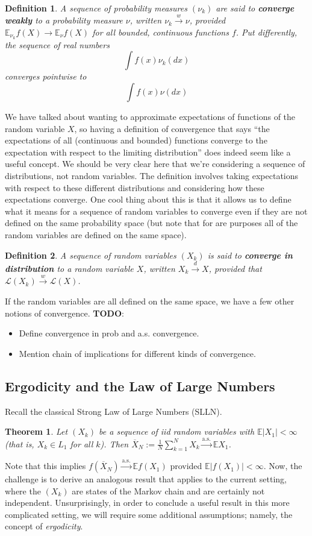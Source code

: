 \documentclass[12pt]{article}
\newcommand*{\abs}[1]{\left\lvert#1\right\rvert}
\newcommand{\E}{\mathbb{E}}
\newtheorem{definition}{Definition}
\newtheorem{thm}{Theorem}
\begin{document}
\begin{definition}
A sequence of probability measures $(\nu_k)$ are said to \textbf{converge weakly} to a probability measure $\nu$, written $\nu_k \overset{w}{\to} \nu$, 
provided $\E_{\nu_k} f(X) \to \E_\nu f(X)$ for all bounded, continuous functions $f$. Put differently, the sequence of real numbers
\[\int f(x) \nu_k(dx) \]
converges pointwise to 
\[\int f(x) \nu(dx)\]
\end{definition}
We have talked about wanting to approximate expectations of functions of the random variable $X$, so having a definition of convergence that says 
``the expectations of all (continuous and bounded) functions converge to the expectation with respect to the limiting distribution'' does indeed seem like 
a useful concept. We should be very clear here that we're considering a sequence of distributions, not random variables. The definition involves taking 
expectations with respect to these different distributions and considering how these expectations converge. One cool thing about this is that it allows us to 
define what it means for a sequence of random variables to converge even if they are not defined on the same probability space (but note that for are purposes 
all of the random variables are defined on the same space). 
\begin{definition}
A sequence of random variables $(X_k)$ is said to \textbf{converge in distribution} to a random variable $X$, written $X_k \overset{d}{\to} X$, provided that 
$\mathcal{L}(X_k) \overset{w}{\to} \mathcal{L}(X)$. 
\end{definition}

If the random variables are all defined on the same space, we have a few other notions of convergence. 
\textbf{TODO}: 
\begin{itemize}
\item Define convergence in prob and a.s. convergence. 
\item Mention chain of implications for different kinds of convergence. 
\end{itemize}

\subsection{Ergodicity and the Law of Large Numbers}
Recall the classical Strong Law of Large Numbers (SLLN). 
\begin{thm}
Let $(X_k)$ be a sequence of iid random variables with $\E \abs{X_1} < \infty$ (that is, $X_k \in L_1$ for all $k$). Then 
$\overline{X}_N := \frac{1}{N} \sum_{k = 1}^{N} X_k \overset{\text{a.s.}}{\to} \E X_1$. 
\end{thm} 
Note that this implies $f(\overline{X}_N) \overset{\text{a.s.}}{\to} \E f(X_1)$ provided $\E \abs{f(X_1)} < \infty$. Now, the challenge is to derive an analogous result
that applies to the current setting, where the $(X_k)$ are states of the Markov chain and are certainly not independent. Unsurprisingly, in order to conclude a useful result
in this more complicated setting, we will require some additional assumptions; namely, the concept of \textit{ergodicity}. 
\end{document}
